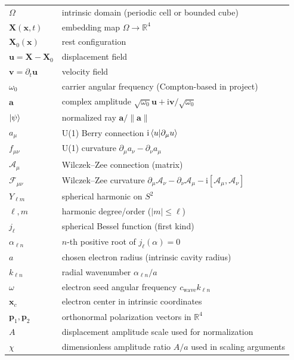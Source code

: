 \documentclass[11pt,a4paper]{article}
\newcommand{\R}{\mathbb{R}}
\providecommand{\ii}{\mathrm{i}}
\newcommand{\X}{\mathbf{X}}                 %
\newcommand{\x}{\mathbf{x}}                 %
\newcommand{\uvec}{\mathbf{u}}              %
\newcommand{\vvec}{\mathbf{v}}              %
\newcommand{\bbA}{\mathcal{A}}              %
\newcommand{\bbF}{\mathcal{F}}              %
\begin{document}
\begin{tabular}{ll}
\(\Omega\) & intrinsic domain (periodic cell or bounded cube) \\
\(\X(\x,t)\) & embedding map \(\Omega\to\R^4\) \\
\(\X_0(\x)\) & rest configuration \\
\(\uvec=\X-\X_0\) & displacement field \\
\(\vvec=\partial_t \uvec\) & velocity field \\
\(\omega_0\) & carrier angular frequency (Compton-based in project) \\
\(\mathbf{a}\) & complex amplitude \(\sqrt{\omega_0}\uvec + \ii \vvec/\sqrt{\omega_0}\) \\
\(\ket{\psi}\) & normalized ray \(\mathbf{a}/\|\mathbf{a}\|\) \\
\(a_\mu\) & U(1) Berry connection \(\ii\braket{u}{\partial_\mu u}\) \\
\(f_{\mu\nu}\) & U(1) curvature \(\partial_\mu a_\nu-\partial_\nu a_\mu\) \\
\(\bbA_\mu\) & Wilczek--Zee connection (matrix) \\
\(\bbF_{\mu\nu}\) & Wilczek--Zee curvature \(\partial_\mu\bbA_\nu-\partial_\nu\bbA_\mu-\ii[\bbA_\mu,\bbA_\nu]\) \\
\(Y_{\ell m}\) & spherical harmonic on \(S^2\) \\
\(\ell,m\) & harmonic degree/order (\(|m|\le \ell\)) \\
\(j_\ell\) & spherical Bessel function (first kind) \\
\(\alpha_{\ell n}\) & \(n\)-th positive root of \(j_\ell(\alpha)=0\) \\
\(a\) & chosen electron radius (intrinsic cavity radius) \\
\(k_{\ell n}\) & radial wavenumber \(\alpha_{\ell n}/a\) \\
\(\omega\) & electron seed angular frequency \(c_{\mathrm{wave}}k_{\ell n}\) \\
\(\x_c\) & electron center in intrinsic coordinates \\
\(\mathbf{p}_1,\mathbf{p}_2\) & orthonormal polarization vectors in \(\R^4\) \\
\(A\) & displacement amplitude scale used for normalization \\
\(\chi\) & dimensionless amplitude ratio \(A/a\) used in scaling arguments \\
\end{tabular}

% 
% 
\end{document}
